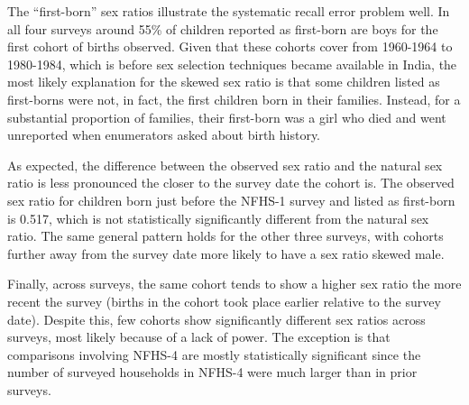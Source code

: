 \documentclass[12pt,letterpaper]{article}
\begin{document}


% 


The ``first-born'' sex ratios illustrate the systematic recall error problem well.
In all four surveys around 55\% of children reported as first-born are boys
for the first cohort of births observed.
Given that these cohorts cover from 1960-1964 to 1980-1984, which is before sex selection 
techniques became available in India, the most likely explanation for the skewed sex ratio 
is that some children listed as first-borns were not, in fact, the first children born in 
their families.
Instead, for a substantial proportion of families, their first-born was a girl who died 
and went unreported when enumerators asked about birth history.

As expected, the difference between the observed sex ratio and the natural sex ratio is 
less pronounced the closer to the survey date the cohort is.
The observed sex ratio for children born just before the NFHS-1 survey and listed as 
first-born is 0.517, which is not statistically significantly different from the
natural sex ratio.
The same general pattern holds for the other three surveys, with cohorts further away
from the survey date more likely to have a sex ratio skewed male.


Finally, across surveys, the same cohort tends to show a higher sex ratio the more recent 
the survey (births in the cohort took place earlier relative to the survey date).
Despite this, few cohorts show significantly different sex ratios across surveys, most 
likely because of a lack of power.
The exception is that comparisons involving NFHS-4 are mostly statistically significant
since the number of surveyed households in NFHS-4 were much larger than in prior surveys.
\end{document}
